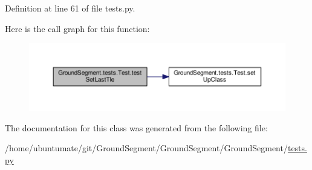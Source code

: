 Definition at line 61 of file tests.\+py.



Here is the call graph for this function\+:\nopagebreak
\begin{figure}[H]
\begin{center}
\leavevmode
\includegraphics[width=350pt]{class_ground_segment_1_1tests_1_1_test_ad983277657ecd03e43e446e21ad9341d_cgraph}
\end{center}
\end{figure}




The documentation for this class was generated from the following file\+:\begin{DoxyCompactItemize}
\item 
/home/ubuntumate/git/\+Ground\+Segment/\+Ground\+Segment/\+Ground\+Segment/\hyperlink{tests_8py}{tests.\+py}\end{DoxyCompactItemize}
